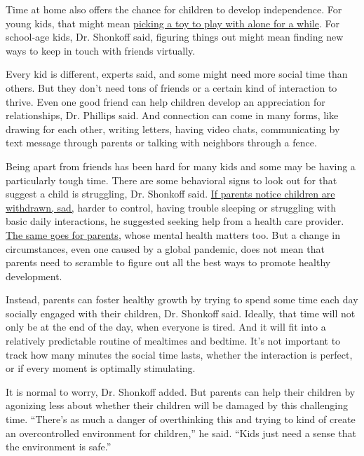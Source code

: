 Time at home also offers the chance for children to develop
independence. For young kids, that might mean
\href{https://www.nytimes3xbfgragh.onion/2020/04/03/parenting/kids-independent-play-coronavirus-quarantine.html}{picking
a toy to play with alone for a while}. For school-age kids, Dr. Shonkoff
said, figuring things out might mean finding new ways to keep in touch
with friends virtually.

Every kid is different, experts said, and some might need more social
time than others. But they don't need tons of friends or a certain kind
of interaction to thrive. Even one good friend can help children develop
an appreciation for relationships, Dr. Phillips said. And connection can
come in many forms, like drawing for each other, writing letters, having
video chats, communicating by text message through parents or talking
with neighbors through a fence.

Being apart from friends has been hard for many kids and some may be
having a particularly tough time. There are some behavioral signs to
look out for that suggest a child is struggling, Dr. Shonkoff said.
\href{https://www.nytimes3xbfgragh.onion/2020/06/02/parenting/virus-children-depression-signs.html}{If
parents notice children are withdrawn, sad,} harder to control, having
trouble sleeping or struggling with basic daily interactions, he
suggested seeking help from a health care provider.
\href{https://www.nytimes3xbfgragh.onion/2020/04/08/parenting/coronavirus-self-care.html}{The
same goes for parents}, whose mental health matters too. But a change in
circumstances, even one caused by a global pandemic, does not mean that
parents need to scramble to figure out all the best ways to promote
healthy development.

Instead, parents can foster healthy growth by trying to spend some time
each day socially engaged with their children, Dr. Shonkoff said.
Ideally, that time will not only be at the end of the day, when everyone
is tired. And it will fit into a relatively predictable routine of
mealtimes and bedtime. It's not important to track how many minutes the
social time lasts, whether the interaction is perfect, or if every
moment is optimally stimulating.

It is normal to worry, Dr. Shonkoff added. But parents can help their
children by agonizing less about whether their children will be damaged
by this challenging time. ``There's as much a danger of overthinking
this and trying to kind of create an overcontrolled environment for
children,'' he said. ``Kids just need a sense that the environment is
safe.''

